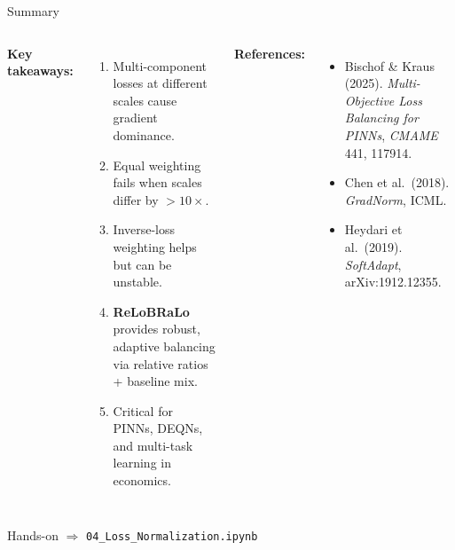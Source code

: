 \documentclass[aspectratio=169,11pt]{beamer}
\newcommand{\emphc}[1]{\textcolor{harvardcrimson}{#1}}
\begin{document}
\begin{frame}{Summary}
\small
\begin{columns}[T]
\textbf{Key takeaways:}
\begin{enumerate}\itemsep1pt
    \item Multi-component losses at different scales cause \emphc{gradient dominance}.
    \item Equal weighting fails when scales differ by $>10\times$.
    \item Inverse-loss weighting helps but can be unstable.
    \item \textbf{ReLoBRaLo} provides robust, adaptive balancing via relative ratios + baseline mix.
    \item Critical for PINNs, DEQNs, and multi-task learning in economics.
\end{enumerate}

\textbf{References:}
{\scriptsize
\begin{itemize}\itemsep0pt
    \item Bischof \& Kraus (2025). \emph{Multi-Objective Loss Balancing for PINNs}, \emph{CMAME} 441, 117914.
    \item Chen et al.\ (2018). \emph{GradNorm}, ICML.
    \item Heydari et al.\ (2019). \emph{SoftAdapt}, arXiv:1912.12355.
\end{itemize}
}
\end{columns}

\vspace{0.3cm}
\begin{block}{Hands-on}
$\Rightarrow$ \texttt{04\_Loss\_Normalization.ipynb}
\end{block}
\end{frame}
\end{document}
